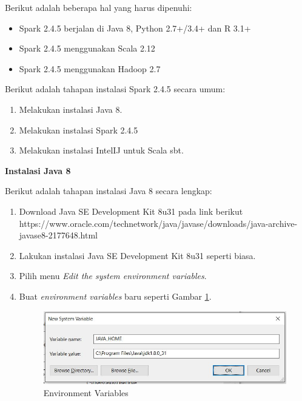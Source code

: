 \documentclass[a4paper,twoside]{article}
\begin{document}
\begin{enumerate}
\noindent Berikut adalah beberapa hal yang harus dipenuhi:

\begin{itemize}
\item Spark 2.4.5 berjalan di Java 8, Python 2.7+/3.4+ dan R 3.1+ 
\item Spark 2.4.5 menggunakan Scala 2.12
\item Spark 2.4.5 menggunakan Hadoop 2.7
\end{itemize}

\noindent Berikut adalah tahapan instalasi Spark 2.4.5 secara umum:

\begin{enumerate}
\item Melakukan instalasi Java 8.
\item Melakukan instalasi Spark 2.4.5
\item Melakukan instalasi IntelIJ untuk Scala sbt.
\end{enumerate}

\textbf{Instalasi Java 8}

\noindent Berikut adalah tahapan instalasi Java 8 secara lengkap:

\begin{enumerate}

\item Download Java SE Development Kit 8u31 pada link berikut \\
\textsf{https://www.oracle.com/technetwork/java/javase/downloads/java-archive-javase8-2177648.html}
 
\item Lakukan instalasi Java SE Development Kit 8u31 seperti biasa.

\item Pilih menu \textit{Edit the system environment variables}.

\item Buat \textit{environment variables} baru seperti Gambar \ref{fig:instal_java_5}.

\begin{figure}[H]
	\centering
	\includegraphics[scale=0.7]{instal_java_5}
	\caption{Environment Variables}
	\label{fig:instal_java_5}
\end{figure}



\end{enumerate}
\end{enumerate}
\end{document}

